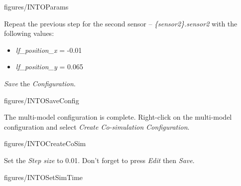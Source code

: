 \documentclass[11pt,a4paper]{../tutorial}
\begin{document}
\begin{instructions}
    \begin{annotation}[width=0.8\linewidth]{figures/INTOParams}
    \end{annotation}


\item Repeat the previous step for the second sensor -- \emph{\{sensor2\}.sensor2} with the following values:
\begin{itemize}
  \item \emph{lf\_position\_x} = -0.01
  \item \emph{lf\_position\_y} = 0.065
\end{itemize}

\item \emph{Save} the \emph{Configuration}.

    \begin{annotation}[width=0.85\linewidth,trim=0 0 0 250,clip]{figures/INTOSaveConfig}
    \end{annotation}

\item The multi-model configuration is complete. Right-click on the multi-model configuration and select \emph{Create Co-simulation Configuration}.

    \begin{annotation}[width=0.85\linewidth,trim=0 120 0 130,clip]{figures/INTOCreateCoSim}
    \end{annotation}

\item Set the \emph{Step size} to 0.01. Don't forget to press \emph{Edit} then \emph{Save}.

    \begin{annotation}[width=0.85\linewidth,trim=0 0 0 0,clip]{figures/INTOSetSimTime}
    \end{annotation}


\end{instructions}
\end{document}
